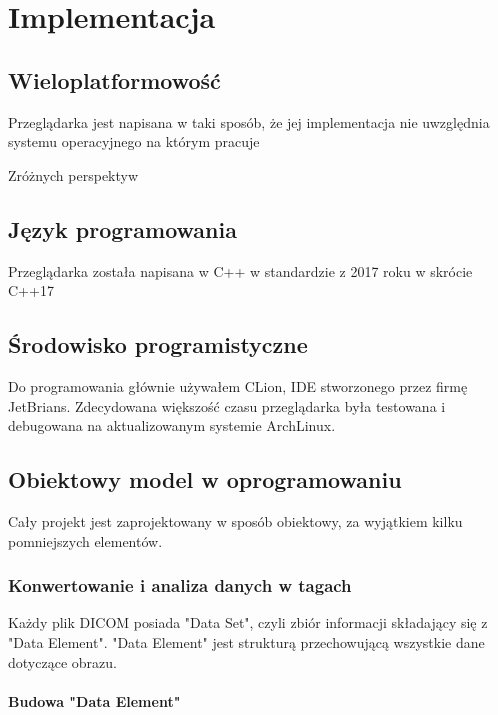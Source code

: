\section{Implementacja}

\subsection{Wieloplatformowość}

Przeglądarka jest napisana w taki sposób, że jej implementacja nie uwzględnia systemu operacyjnego na którym pracuje

Zróżnych perspektyw

\subsection{Język programowania}

Przeglądarka została napisana w C++ w standardzie z 2017 roku w skrócie C++17

\subsection{Środowisko programistyczne}

Do programowania głównie używałem CLion, IDE stworzonego przez firmę JetBrians.
Zdecydowana większość czasu przeglądarka była testowana i debugowana na aktualizowanym systemie ArchLinux.

\subsection{Obiektowy model w oprogramowaniu}

Cały projekt jest zaprojektowany w sposób obiektowy, za wyjątkiem kilku pomniejszych elementów.

\subsubsection{Konwertowanie i analiza danych w tagach}

Każdy plik DICOM posiada "Data Set", czyli zbiór informacji składający się z "Data Element".
"Data Element" jest strukturą przechowującą wszystkie dane dotyczące obrazu.

\paragraph{Budowa "Data Element"}

